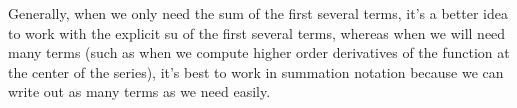 \documentclass{ximera}
\begin{document}
\begin{exercise}
\begin{exercise}
Generally, when we only need the sum of the first several terms, it's a better idea to work with the explicit su of the first several terms, whereas when we will need many terms (such as when we compute higher order derivatives of the function at the center of the series), it's best to work in summation notation because we can write out as many terms as we need easily.

\end{exercise}
\end{exercise}
\end{document}

